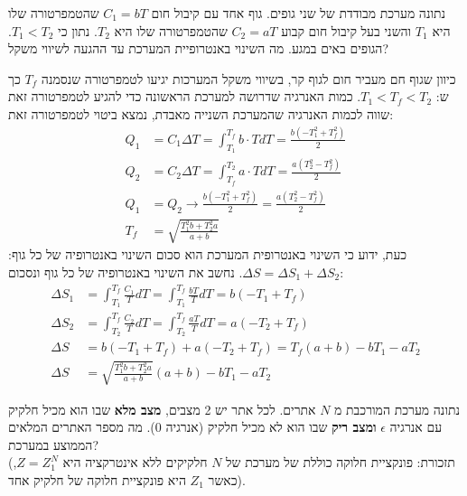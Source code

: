 \documentclass{article}
\begin{document}
\begin{Question}
נתונה מערכת מבודדת של שני גופים. גוף אחד עם קיבול חום $C_{1}=bT$ שהטמפרטורה שלו היא $T_{1}$ והשני בעל קיבול חום קבוע $C_{2}=aT$ שהטמפרטורה שלו היא $T_{2}$. נתון כי $T_{1}<T_{2}$. הגופים באים במגע. מה השינוי באנטרופיית המערכת עד ההגעה לשיווי משקל?
\end{Question}
\begin{Answer}
כיוון שגוף חם מעביר חום לגוף קר, בשיווי משקל המערכות יגיעו לטמפרטורה שנסמנה $T_{f}$ כך ש: $T_{1}<T_{f}<T_{2}$.
כמות האנרגיה שדרושה למערכת הראשונה כדי להגיע לטמפרטורה זאת שווה לכמות האנרגיה שהמערכת השנייה מאבדת, נמצא ביטוי לטמפרטורה זאת:
\begin{align*}
    Q_{1}&=C_{1}\Delta T=\int_{T_{1}}^{T_{f}}b\cdot T dT  = \frac{b (- T_{1}^{2} + T_{f}^{2})}{2}\\
    Q_{2}&=C_{2}\Delta T=\int_{T_{f}}^{T_{2}}a\cdot T dT = \frac{a (T_{2}^{2} - T_{f}^{2})}{2}\\
    Q_{1}&=Q_{2}\rightarrow \frac{b (- T_{1}^{2} + T_{f}^{2})}{2}=\frac{a (T_{2}^{2} - T_{f}^{2})}{2}\\
    T_{f}&=\sqrt{\frac{T_{1}^{2}b+T_{2}^{2}a}{a+b}}
\end{align*}
כעת, ידוע כי השינוי באנטרופית המערכת הוא סכום השינוי באנטרופיה של כל גוף: $\Delta S=\Delta S_{1}+\Delta S_{2}$. נחשב את השינוי באנטרופיה של כל גוף ונסכום:
\begin{align*}
    \Delta S_{1}&=\int_{T_{1}}^{T_{f}}\frac{C_{1}}{T}dT=\int_{T_{1}}^{T_{f}}\frac{bT}{T}dT = b (- T_{1} + T_{f})\\
    \Delta S_{2}&=\int_{T_{2}}^{T_{f}}\frac{C_{2}}{T}dT=\int_{T_{2}}^{T_{f}}\frac{aT}{T}dT = a (- T_{2} + T_{f})\\
    \Delta S&=b (- T_{1} + T_{f})+a (- T_{2} + T_{f})=T_{f}(a+b)-bT_{1}-aT_{2}\\
    \Delta S&=\sqrt{\frac{T_{1}^{2}b+T_{2}^{2}a}{a+b}}(a+b)-bT_{1}-aT_{2}
\end{align*}
\end{Answer}\newpage
\begin{Question}
נתונה מערכת המורכבת מ $N$ אתרים. לכל אתר יש 2 מצבים, \textbf{מצב מלא} שבו הוא מכיל חלקיק עם אנרגיה $\epsilon$ \textbf{ומצב ריק} שבו הוא לא מכיל חלקיק (אנרגיה 0). מה מספר האתרים המלאים הממוצע במערכת?\\
(תזכורת: פונקציית חלוקה כוללת של מערכת של $N$ חלקיקים ללא אינטרקציה היא $Z=Z_{1}^{N}$, כאשר $Z_{1}$ היא פונקציית חלוקה של חלקיק אחד).
\end{Question}
\end{document}
